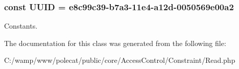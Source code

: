 \subsubsection[{U\+U\+I\+D}]{\setlength{\rightskip}{0pt plus 5cm}const U\+U\+I\+D = \textquotesingle{}e8c99c39-\/b7a3-\/11e4-\/a12d-\/0050569e00a2\textquotesingle{}}\label{class_able_polecat___access_control___constraint___read_a74b892c8c0b86bf9d04c5819898c51e7}
Constants. 

The documentation for this class was generated from the following file\+:\begin{DoxyCompactItemize}
\item 
C\+:/wamp/www/polecat/public/core/\+Access\+Control/\+Constraint/Read.\+php\end{DoxyCompactItemize}

